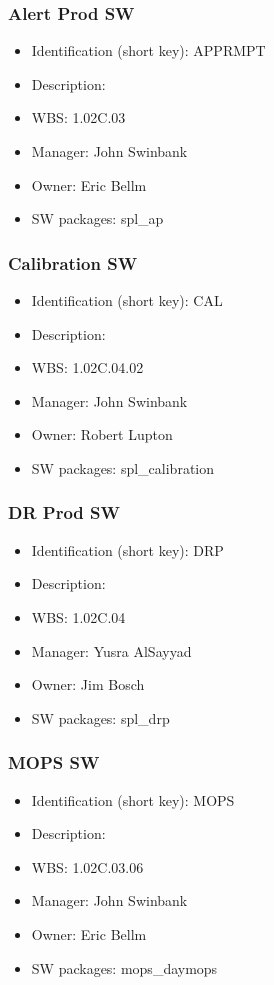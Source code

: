\subsubsection{Alert Prod SW}\label{sect:APPRMPT}
\begin{itemize}
\item Identification (short key): APPRMPT
\item Description: 
\item WBS: 1.02C.03
\item Manager: John Swinbank
\item Owner: Eric Bellm
\item SW packages: spl\_ap
\end{itemize}

\subsubsection{Calibration SW}\label{sect:CAL}
\begin{itemize}
\item Identification (short key): CAL
\item Description: 
\item WBS: 1.02C.04.02
\item Manager: John Swinbank
\item Owner: Robert Lupton
\item SW packages: spl\_calibration
\end{itemize}

\subsubsection{DR Prod SW}\label{sect:DRP}
\begin{itemize}
\item Identification (short key): DRP
\item Description: 
\item WBS: 1.02C.04
\item Manager: Yusra AlSayyad
\item Owner: Jim Bosch
\item SW packages: spl\_drp
\end{itemize}

\subsubsection{MOPS SW}\label{sect:MOPS}
\begin{itemize}
\item Identification (short key): MOPS
\item Description: 
\item WBS: 1.02C.03.06
\item Manager: John Swinbank
\item Owner: Eric Bellm
\item SW packages: mops\_daymops
\end{itemize}

